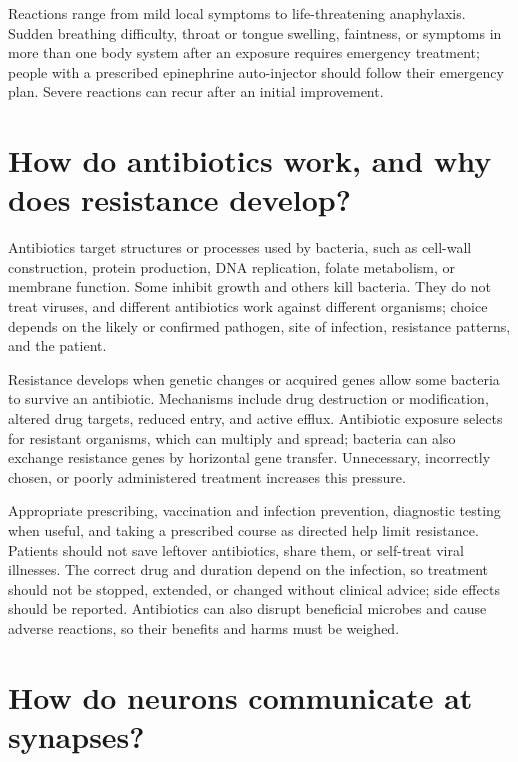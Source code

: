 \documentclass[11pt,oneside]{report}
\begin{document}
Reactions range from mild local symptoms to life-threatening anaphylaxis.
Sudden breathing difficulty, throat or tongue swelling, faintness, or symptoms
in more than one body system after an exposure requires emergency treatment;
people with a prescribed epinephrine auto-injector should follow their
emergency plan. Severe reactions can recur after an initial improvement.

\section{How do antibiotics work, and why does resistance develop?}

Antibiotics target structures or processes used by bacteria, such as cell-wall
construction, protein production, DNA replication, folate metabolism, or
membrane function. Some inhibit growth and others kill bacteria. They do not
treat viruses, and different antibiotics work against different organisms;
choice depends on the likely or confirmed pathogen, site of infection,
resistance patterns, and the patient.

Resistance develops when genetic changes or acquired genes allow some bacteria
to survive an antibiotic. Mechanisms include drug destruction or modification,
altered drug targets, reduced entry, and active efflux. Antibiotic exposure
selects for resistant organisms, which can multiply and spread; bacteria can
also exchange resistance genes by horizontal gene transfer. Unnecessary,
incorrectly chosen, or poorly administered treatment increases this pressure.

Appropriate prescribing, vaccination and infection prevention, diagnostic
testing when useful, and taking a prescribed course as directed help limit
resistance. Patients should not save leftover antibiotics, share them, or
self-treat viral illnesses. The correct drug and duration depend on the
infection, so treatment should not be stopped, extended, or changed without
clinical advice; side effects should be reported. Antibiotics can also disrupt
beneficial microbes and cause adverse reactions, so their benefits and harms
must be weighed.

\section{How do neurons communicate at synapses?}
\end{document}
